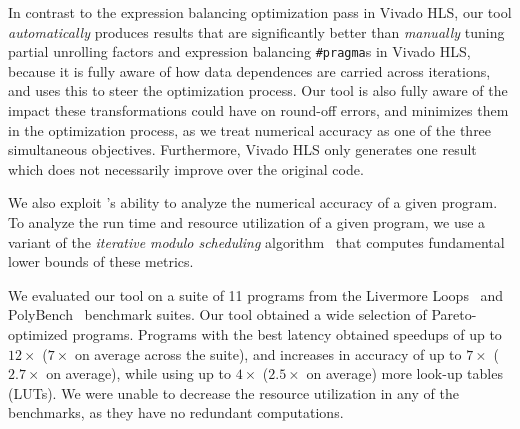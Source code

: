 In contrast to the expression balancing optimization pass in Vivado HLS,
our tool \emph{automatically} produces results that are significantly
better than \emph{manually} tuning partial unrolling factors and expression
balancing \verb|#pragma|s in Vivado HLS, because it is fully aware of how
data dependences are carried across iterations, and uses this to steer the
optimization process.  Our tool is also fully aware of the impact these
transformations could have on round-off errors, and minimizes them in the
optimization process, as we treat numerical accuracy as one of the three
simultaneous objectives.  Furthermore, Vivado HLS only generates one result
which does not necessarily improve over the original code.


We also exploit \SOAP{}'s ability to analyze the numerical accuracy of
a given program.  To analyze the run time and resource utilization of a
given program, we use a variant of the \emph{iterative modulo scheduling}
algorithm~\cite{rau94} that computes fundamental lower bounds of these metrics.

We evaluated our tool on a suite of 11 programs from the Livermore
Loops~\cite{livermore} and PolyBench~\cite{polybench} benchmark suites.  Our
tool obtained a wide selection of Pareto-optimized programs.  Programs with
the best latency obtained speedups of up to $12\times$ ($7\times$ on average
across the suite), and increases in accuracy of up to $7\times$ ($2.7\times$
on average), while using up to $4\times$ ($2.5\times$ on average) more look-up
tables (LUTs).  We were unable to decrease the resource utilization in any of
the benchmarks, as they have no redundant computations.

